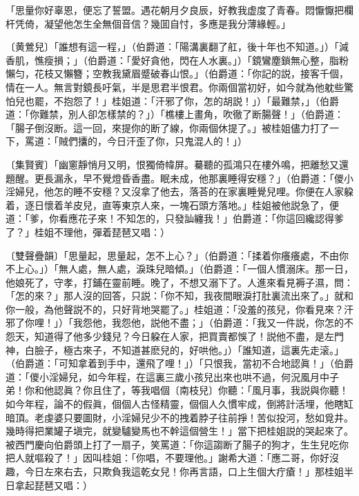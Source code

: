 \begin{myquote}
「思量你好辜恩，便忘了誓盟。遇花朝月夕良辰，好教我虚度了青春。悶懨懨把欄杆凭倚，凝望他怎生全無個音信？幾囬自忖，多應是我分薄緣輕。」

{\markfont〔黄鶯兒〕}「誰想有這一程，」{\markfont\small\color{mydarkgray}（伯爵道：「陽溝裏翻了舡，後十年也不知道。」）}「減香肌，憔瘦損；」{\markfont\small\color{mydarkgray}（伯爵道：「愛好貪他，閃在人水裏。」）}「鏡鸞塵鎖無心整，脂粉懶匀，花枝又懶簪；空教我黛眉蹙破春山恨。」{\markfont\small\color{mydarkgray}（伯爵道：「你記的説，接客千個，情在一人。無言對鏡長吁氣，半是思君半恨君。你兩個當初好，如今就為他躭些驚怕兒也罷，不抱怨了！」桂姐道：「汗邪了你，怎的胡説！」）}「最難禁，」{\markfont\small\color{mydarkgray}（伯爵道：「你難禁，別人卻怎樣禁的？」）}「樵樓上畫角，吹徹了断腸聲！」{\markfont\small\color{mydarkgray}（伯爵道：「腸子倒沒断。這一回，來提你的断了線，你兩個休提了。」被桂姐儘力打了一下，罵道：「賊們攮的，今日汗歪了你，只鬼混人的！」）}

{\markfont〔集賢賓〕}「幽窻靜悄月又明，恨獨倚幃屏。驀聽的孤鴻只在樓外鳴，把離愁又還題醒。更長漏永，早不覺燈昏香盡。眠未成，他那裏睡得安穩？」{\markfont\small\color{mydarkgray}（伯爵道：「儍小淫婦兒，他怎的睡不安穩？又沒拿了他去，落荅的在家裏睡覺兒哩。你便在人家躱着，逐日懷着羊皮兒，直等東京人來，一塊石頭方落地。」桂姐被他説急了，便道：「爹，你看應花子來！不知怎的，只發訕纏我！」伯爵道：「你這回纔認得爹了？」桂姐不理他，彈着琵琶又唱：）}

{\markfont〔雙聲疊韻〕}「思量起，思量起，怎不上心？」{\markfont\small\color{mydarkgray}（伯爵道：「揉着你癢癢處，不由你不上心。」）}「無人處，無人處，淚珠兒暗傾。」{\markfont\small\color{mydarkgray}（伯爵道：「一個人慣溺床。那一日，他娘死了，守孝，打鋪在靈前睡。晚了，不想又溺下了。人進來看見褥子濕，問：「怎的來？」那人沒的回答，只説：「你不知，我夜間眼淚打肚裏流出來了。」就和你一般，為他聲説不的，只好背地哭罷了。」桂姐道：「没羞的孩兒，你看見來？汗邪了你哩！」）}「我怨他，我怨他，説他不盡；」{\markfont\small\color{mydarkgray}（伯爵道：「我又一件説，你怎的不怨天，知道得了他多少錢兒？今日躱在人家，把買賣都悞了！説他不盡，是左門神，白臉子，極古來子，不知道甚麽兒的，好哄他。」）}「誰知道，這裏先走滚。」{\markfont\small\color{mydarkgray}（伯爵道：「可知拿着到手中，還飛了哩！」）}「只恨我，當初不合地認眞！」{\markfont\small\color{mydarkgray}（伯爵道：「儍小淫婦兒，如今年程，在這裏三歲小孩兒出來也哄不過，何況風月中子弟！你和他認眞？你且住了，等我唱個〔南枝兒〕你聽：「風月事，我説與你聽！如今年程，論不的假眞，個個人古怪精靈，個個人久慣牢成，倒將計活埋，他瞎缸暗頂。老虔婆只要圖財，小淫婦兒少不的拽着脖子往前掙！苦似投河，愁如覓井。幾時得把業罐子塡完，就變驢變馬也不幹這個營生！」當下把桂姐説的哭起來了。被西門慶向伯爵頭上打了一扇子，笑罵道：「你這謅断了腸子的狗才，生生兒吃你把人就嘔殺了！」因叫桂姐：「你唱，不要理他。」謝希大道：「應二哥，你好沒趣，今日左來右去，只欺負我這乾女兒！你再言語，口上生個大疔瘡！」那桂姐半日拿起琵琶又唱：）}


\end{myquote}
